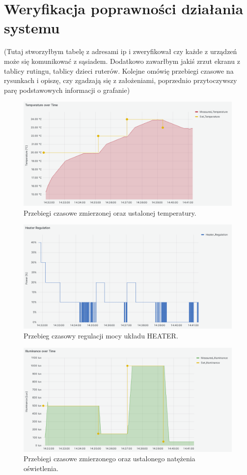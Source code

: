 \chapter{Weryfikacja poprawności działania systemu}


(Tutaj stworzyłbym tabelę z adresami ip i zweryfikował czy każde z urządzeń może się komunikować z sąsiadem. Dodatkowo zawarłbym jakiś zrzut ekranu z tablicy rutingu, tablicy dzieci ruterów. Kolejne omówię przebiegi czasowe na rysunkach i opiszę, czy zgadzają się z założeniami, poprzednio przytoczywszy parę podstawowych informacji o grafanie)

    \begin{figure}[H]
        \centering
        \includegraphics[width=0.8\linewidth]{graphics/grafana/temperature-lm.png}
        \caption{Przebiegi czasowe zmierzonej oraz ustalonej temperatury.}
        \label{fig:graph-heater-temperature}
    \end{figure}

    \begin{figure}[H]
        \centering
        \includegraphics[width=0.8\linewidth]{graphics/grafana/heater-regulation-lm.png}
        \caption{Przebieg czasowy regulacji mocy układu HEATER.}
        \label{fig:graph-heater-regulation}
    \end{figure}

    \begin{figure}[H]
        \centering
        \includegraphics[width=0.8\linewidth]{graphics/grafana/illuminance-lm.png}
        \caption{Przebiegi czasowe zmierzonego oraz ustalonego natężenia oświetlenia.}
        \label{fig:graph-dimmer-illuminance}
    \end{figure}

